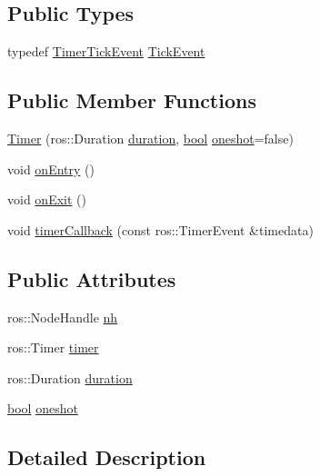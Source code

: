 \subsection*{Public Types}
\begin{DoxyCompactItemize}
\item 
typedef \hyperlink{structsmacc_1_1TimerTickEvent}{Timer\+Tick\+Event} \hyperlink{classsmacc_1_1Timer_a6f72664250a9ee757619db1605529b98}{Tick\+Event}
\end{DoxyCompactItemize}
\subsection*{Public Member Functions}
\begin{DoxyCompactItemize}
\item 
\hyperlink{classsmacc_1_1Timer_afcfaad17f6105255a438b2b442bd0cdf}{Timer} (ros\+::\+Duration \hyperlink{classsmacc_1_1Timer_a564c0bbd2b12909d61a1345358c641fc}{duration}, \hyperlink{classbool}{bool} \hyperlink{classsmacc_1_1Timer_a8b460b006b7173f718dfa5868c0eb59d}{oneshot}=false)
\item 
void \hyperlink{classsmacc_1_1Timer_ab99111438ad35cf740ed4bd8c136ff6a}{on\+Entry} ()
\item 
void \hyperlink{classsmacc_1_1Timer_a5b207b96df3c5a698706da5cde0c711a}{on\+Exit} ()
\item 
void \hyperlink{classsmacc_1_1Timer_a3939cbeb19e5a7d9c02c56064805b242}{timer\+Callback} (const ros\+::\+Timer\+Event \&timedata)
\end{DoxyCompactItemize}
\subsection*{Public Attributes}
\begin{DoxyCompactItemize}
\item 
ros\+::\+Node\+Handle \hyperlink{classsmacc_1_1Timer_a84b2854ae319292c9351325d98615a66}{nh}
\item 
ros\+::\+Timer \hyperlink{classsmacc_1_1Timer_a1376795baefaab38614fc108aeb4f36c}{timer}
\item 
ros\+::\+Duration \hyperlink{classsmacc_1_1Timer_a564c0bbd2b12909d61a1345358c641fc}{duration}
\item 
\hyperlink{classbool}{bool} \hyperlink{classsmacc_1_1Timer_a8b460b006b7173f718dfa5868c0eb59d}{oneshot}
\end{DoxyCompactItemize}


\subsection{Detailed Description}


